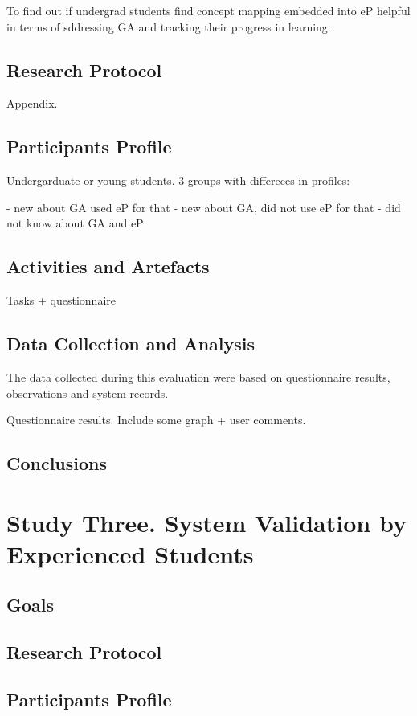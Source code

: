 To find out if undergrad students find concept mapping embedded into eP helpful
in terms of sddressing GA and tracking their progress in learning.

\subsection{Research Protocol}

Appendix.

\subsection{Participants Profile}

Undergarduate or young students. 
3 groups with differeces in profiles:

- new about GA used eP for that
- new about GA, did not use eP for that
- did not know about GA and eP

\subsection{Activities and Artefacts}

Tasks + questionnaire

\subsection{Data Collection and Analysis}

The data collected during this evaluation were based on questionnaire results,
observations and system records.

Questionnaire results. Include some graph + user comments.

\subsection{Conclusions}
 
\section{Study Three. System Validation by Experienced Students}
\subsection{Goals}
\subsection{Research Protocol}
\subsection{Participants Profile}

